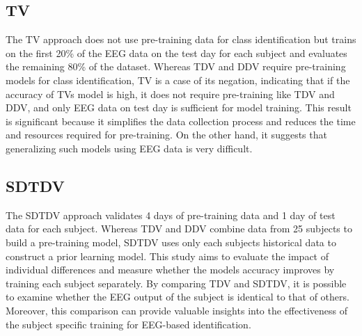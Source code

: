     \subsection{TV}
    The TV approach does not use pre-training data for class identification but
    trains on the first 20\% of the EEG data on the test day for each subject and
    evaluates the remaining 80\%
    of the dataset. Whereas TDV and DDV require pre-training models for class identification,
    TV is a case of its negation, indicating that if the accuracy of TVs model is
    high, it does not require pre-training like TDV and DDV, and only EEG data on
    test day is sufficient for model training. This result is significant
    because it simplifies the data collection process and reduces the time and
    resources required for pre-training. On the other hand, it suggests that
    generalizing such models using EEG data is very difficult.

    \subsection{SDTDV}
    The SDTDV approach validates 4 days of pre-training data and 1 day of test
    data for each subject. Whereas TDV and DDV combine data from 25 subjects to
    build a pre-training model, SDTDV uses only each subjects historical data
    to construct a prior learning model. This study aims to
    evaluate the impact of individual differences and measure whether the models
    accuracy improves by training each subject separately. By comparing TDV and
    SDTDV, it is possible to examine whether the EEG output of the subject is identical
    to that of others. Moreover, this comparison can provide valuable insights into
    the effectiveness of the subject specific training for EEG-based identification.